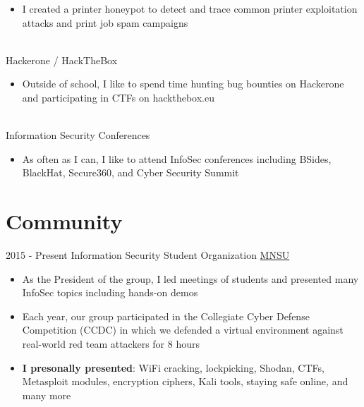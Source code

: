 \documentclass[a4paper]{twentysecondcv} %
\begin{document}
\begin{twenty}
        {\vspace{-2mm}}
        {\begin{itemize}
        \item I created a printer honeypot to detect and trace common printer exploitation attacks and print job spam campaigns
        \end{itemize}}
    \\
     \twentyitem
    	{\hspace{10mm} \Large \faGlobe}
		{}
        {Hackerone / HackTheBox}
        {}
        {\vspace{-2mm}}
        {\begin{itemize}
        \item Outside of school, I like to spend time hunting bug bounties on Hackerone and participating in CTFs on hackthebox.eu
        \end{itemize}}
    \\
     \twentyitem
    	{\hspace{10mm} \Large \faUsers}
		{}
        {Information Security Conferences}
        {}
        {\vspace{-2mm}}
        {\begin{itemize}
        \item As often as I can, I like to attend InfoSec conferences including BSides, BlackHat, Secure360, and Cyber Security Summit
        \end{itemize}}

\end{twenty}

\section{Community}

\begin{twenty}
    \twentyitem
    	{2015 -}
		{Present}
        {Information Security Student Organization}
        {\href{https://mankato.mnsu.edu/}{MNSU}}
        {}
        {\begin{itemize}
        \item As the President of the group, I led meetings of students and presented many InfoSec topics including hands-on demos
        \item Each year, our group participated in the Collegiate Cyber Defense Competition (CCDC) in which we defended a virtual environment against real-world red team attackers for 8 hours
        \item \textbf{I presonally presented}: WiFi cracking, lockpicking, Shodan, CTFs, Metasploit modules, encryption ciphers, Kali tools, staying safe online, and many more
        \end{itemize}}
\end{twenty}
\end{document}
